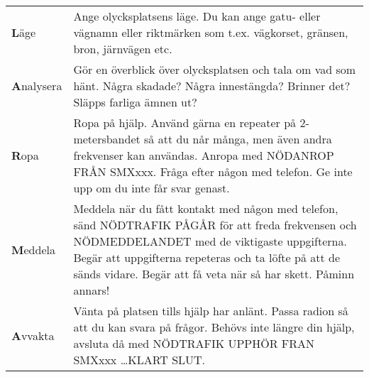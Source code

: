 \begin{tabular}{lp{5cm}}
  \textbf{L}äge &
  Ange olycksplatsens läge. Du kan ange gatu- eller vägnamn eller riktmärken som
  t.ex. vägkorset, gränsen, bron, järnvägen etc.
  \\
  \textbf{A}nalysera
  &
  Gör en överblick över
  olycksplatsen och tala om vad som hänt.  Några skadade? Några innestängda?
  Brinner det? Släpps farliga ämnen ut?
  \\
  \textbf{R}opa &
  Ropa på hjälp. Använd gärna en repeater på 2-metersbandet så att du når många,
  men även andra frekvenser kan användas.  Anropa med NÖDANROP FRÅN SMXxxx. Fråga
  efter någon med telefon. Ge inte upp om du inte får svar genast.
  \\
  \textbf{M}eddela &
  Meddela när du fått kontakt med någon med telefon, sänd NÖDTRAFIK PÅGÅR för att
  freda frekvensen och NÖDMEDDELANDET med de viktigaste uppgifterna. Begär att
  uppgifterna repeteras och ta löfte på att de sänds vidare. Begär att få veta när
  så har skett. Påminn annars!
  \\
  \textbf{A}vvakta
  &
  Vänta på platsen tills hjälp har
  anlänt. Passa radion så att du kan svara på frågor. Behövs inte längre din
  hjälp, avsluta då med NÖDTRAFIK UPPHÖR FRAN SMXxxx \dots KLART SLUT.
\end{tabular}

